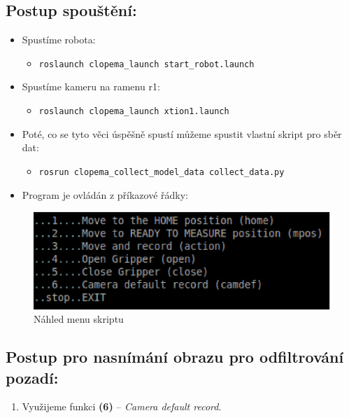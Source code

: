 \documentclass[10pt,a4paper,titlepage,oneside]{book}
\begin{document}
\subsection*{Postup spouštění:}

\begin{itemize}
  \item Spustíme robota: 
  \begin{itemize} 
  
  	\item \verb|roslaunch clopema_launch start_robot.launch|
  \end{itemize}
  
  \item Spustíme kameru na ramenu r1:
  \begin{itemize}
  	\item \verb|roslaunch clopema_launch xtion1.launch|
  \end{itemize}
  
  \item Poté, co se tyto věci úspěšně spustí můžeme spustit vlastní skript pro sběr dat:
  \begin{itemize}
  	\item \verb|rosrun clopema_collect_model_data collect_data.py|
  \end{itemize}
  
  \item Program je ovládán z příkazové řádky:
  
\end{itemize}

\begin{figure}[H]
	\centering  	
  	\includegraphics[scale=0.6]{pictures/obrazek3.eps}
  	\caption{Náhled menu skriptu}
  	\label{fig:obrazek3}
\end{figure}

\subsection*{Postup pro nasnímání obrazu pro odfiltrování pozadí:}
\begin{enumerate}
  \item Využijeme funkci \textbf{(6)} – \textit{Camera default record}.
\end{enumerate}
\end{document}
